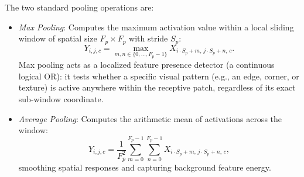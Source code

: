The two standard pooling operations are:
\begin{itemize}[leftmargin=*]
  \item \textit{Max Pooling}: Computes the maximum activation value within a local sliding window of spatial size $F_p \times F_p$ with stride $S_p$:
    \begin{equation}
    Y_{i, j, c} = \max_{m, n \in \{0, \dots, F_p-1\}} X_{i \cdot S_p + m, \, j \cdot S_p + n, \, c}.
    \label{eq:max_pooling_formula}
    \end{equation}
    Max pooling acts as a localized feature presence detector (a continuous logical OR): it tests whether a specific visual pattern (e.g., an edge, corner, or texture) is active anywhere within the receptive patch, regardless of its exact sub-window coordinate.
  \item \textit{Average Pooling}: Computes the arithmetic mean of activations across the window:
    \begin{equation}
    Y_{i, j, c} = \frac{1}{F_p^2} \sum_{m=0}^{F_p-1} \sum_{n=0}^{F_p-1} X_{i \cdot S_p + m, \, j \cdot S_p + n, \, c},
    \label{eq:avg_pooling_formula}
    \end{equation}
    smoothing spatial responses and capturing background feature energy.
\end{itemize}

